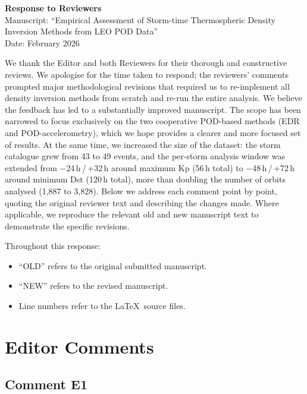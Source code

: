 \documentclass[11pt]{article}
\begin{document}
\begin{center}
{\LARGE\bfseries Response to Reviewers}\\[12pt]
{\large Manuscript: ``Empirical Assessment of Storm-time Thermospheric Density\\
Inversion Methods from LEO POD Data''}\\[8pt]
{\normalsize Date: February 2026}
\end{center}

\bigskip

We thank the Editor and both Reviewers for their thorough and constructive reviews. We apologise for the time taken to respond; the reviewers' comments prompted major methodological revisions that required us to re-implement all density inversion methods from scratch and re-run the entire analysis. We believe the feedback has led to a substantially improved manuscript. The scope has been narrowed to focus exclusively on the two cooperative POD-based methods (EDR and POD-accelerometry), which we hope provides a clearer and more focused set of results. At the same time, we increased the size of the dataset: the storm catalogue grew from 43 to 49 events, and the per-storm analysis window was extended from $-$24\,h\,/\,+32\,h around maximum Kp (56\,h total) to $-$48\,h\,/\,+72\,h around minimum Dst (120\,h total), more than doubling the number of orbits analysed (1,887 to 3,828). Below we address each comment point by point, quoting the original reviewer text and describing the changes made. Where applicable, we reproduce the relevant old and new manuscript text to demonstrate the specific revisions.

Throughout this response:
\begin{itemize}[nosep]
  \item ``OLD'' refers to the original submitted manuscript.
  \item ``NEW'' refers to the revised manuscript.
  \item Line numbers refer to the \LaTeX\ source files.
\end{itemize}

\section{Editor Comments}

\subsection{Comment E1}
\end{document}
